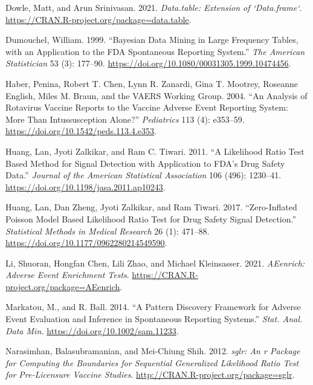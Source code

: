 \begin{CSLReferences}{1}{0}
\leavevmode{}%
Dowle, Matt, and Arun Srinivasan. 2021. \emph{Data.table: Extension of `Data.frame`}. \url{https://CRAN.R-project.org/package=data.table}.

\leavevmode{}%
Dumouchel, William. 1999. {``Bayesian Data Mining in Large Frequency Tables, with an Application to the {FDA} Spontaneous Reporting System.''} \emph{The American Statistician} 53 (3): 177--90. \url{https://doi.org/10.1080/00031305.1999.10474456}.

\leavevmode{}%
Haber, Penina, Robert T. Chen, Lynn R. Zanardi, Gina T. Mootrey, Roseanne English, Miles M. Braun, and the VAERS Working Group. 2004. {``An Analysis of Rotavirus Vaccine Reports to the Vaccine Adverse Event Reporting System: More Than Intussusception Alone?''} \emph{Pediatrics} 113 (4): e353--59. \url{https://doi.org/10.1542/peds.113.4.e353}.

\leavevmode{}%
Huang, Lan, Jyoti Zalkikar, and Ram C. Tiwari. 2011. {``A Likelihood Ratio Test Based Method for Signal Detection with Application to FDA{'}s Drug Safety Data.''} \emph{Journal of the American Statistical Association} 106 (496): 1230--41. \url{https://doi.org/10.1198/jasa.2011.ap10243}.

\leavevmode{}%
Huang, Lan, Dan Zheng, Jyoti Zalkikar, and Ram Tiwari. 2017. {``Zero-Inflated Poisson Model Based Likelihood Ratio Test for Drug Safety Signal Detection.''} \emph{Statistical Methods in Medical Research} 26 (1): 471--88. \url{https://doi.org/10.1177/0962280214549590}.

\leavevmode{}%
Li, Shuoran, Hongfan Chen, Lili Zhao, and Michael Kleinsasser. 2021. \emph{{AEenrich: Adverse Event Enrichment Tests}}. \url{https://CRAN.R-project.org/package=AEenrich}.

\leavevmode{}%
Markatou, M., and R. Ball. 2014. {``A Pattern Discovery Framework for Adverse Event Evaluation and Inference in Spontaneous Reporting Systems.''} \emph{Stat. Anal. Data Min.} \url{https://doi.org/10.1002/sam.11233}.

\leavevmode{}%
Narasimhan, Balasubramanian, and Mei-Chiung Shih. 2012. \emph{{sglr}: An r Package for Computing the Boundaries for Sequential Generalized Likelihood Ratio Test for Pre-Licensure Vaccine Studies}. \url{http://CRAN.R-project.org/package=sglr}.


\end{CSLReferences}
